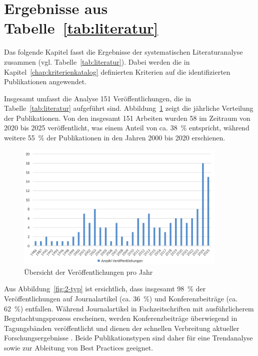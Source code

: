 \section{Ergebnisse aus Tabelle~\ref{tab:literatur}}\label{chap:results_lit}

Das folgende Kapitel fasst die Ergebnisse der systematischen Literaturanalyse zusammen (vgl. Tabelle~\ref{tab:literatur}). Dabei werden die in Kapitel~\ref{chap:kriterienkatalog} definierten Kriterien auf die identifizierten Publikationen angewendet.

\vspace{1em}

Insgesamt umfasst die Analyse 151 Veröffentlichungen, die in Tabelle~\ref{tab:literatur} aufgeführt sind. Abbildung~\ref{fig:1-veroeffentlichungen-jahr} zeigt die jährliche Verteilung der Publikationen. Von den insgesamt 151 Arbeiten wurden 58 im Zeitraum von 2020 bis 2025 veröffentlicht, was einem Anteil von ca. 38~\% entspricht, während weitere 55~\% der Publikationen in den Jahren 2000 bis 2020 erschienen.

\begin{figure}[!htbp]
    \centering
    \includegraphics[width=0.90\textwidth]{graphics_lit/1-veroeffentlichungen-jahr.png}
    \caption{Übersicht der Veröffentlichungen pro Jahr}
    \label{fig:1-veroeffentlichungen-jahr}
\end{figure}

Aus Abbildung~\ref{fig:2-typ} ist ersichtlich, dass insgesamt 98~\% der Veröffentlichungen auf Journalartikel (ca. 36~\%) und Konferenzbeiträge (ca. 62~\%) entfallen. Während Journalartikel in Fachzeitschriften mit ausführlicherem Begutachtungsprozess erscheinen, werden Konferenzbeiträge überwiegend in Tagungsbänden veröffentlicht und dienen der schnellen Verbreitung aktueller Forschungsergebnisse \cite{abbadia_conference_2022}. Beide Publikationstypen sind daher für eine Trendanalyse sowie zur Ableitung von Best Practices geeignet.

